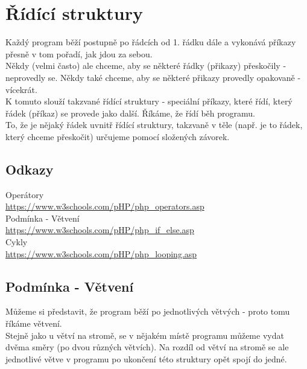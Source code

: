 \section{Řídící struktury}
Každý program běží postupně po řádcích od 1. řádku dále a vykonává příkazy přesně v tom pořadí, jak jdou za sebou.\\
Někdy (velmi často) ale chceme, aby se některé řádky (přikazy) přeskočily - neprovedly se. Někdy také chceme, aby se některé přikazy provedly opakovaně - vícekrát.\\
K tomuto slouží takzvané řídící struktury - speciální příkazy, které řídí, který řádek (příkaz) se provede jako další. Říkáme, že řídí běh programu.\\
To, že je nějaký řádek uvnitř řídící struktury, takzvaně v těle (např. je to řádek, který chceme přeskočit) určujeme pomocí složených závorek.

\subsection{Odkazy}
Operátory\\ \url{https://www.w3schools.com/pHP/php_operators.asp} \\
Podmínka - Větvení\\ \url{https://www.w3schools.com/pHP/php_if_else.asp} \\ 
Cykly \\ \url{https://www.w3schools.com/pHP/php_looping.asp} \\ 

\subsection{Podmínka - Větvení}
Můžeme si představit, že program běží po jednotlivých větvých - proto tomu říkáme větvení.\\ 
Stejně jako u větví na stromě, se v nějakém místě programu můžeme vydat dvěma směry (po dvou různých větvích). Na rozdíl od větví na stromě se ale jednotlivé větve v programu po ukončení této struktury opět spojí do jedné. 

